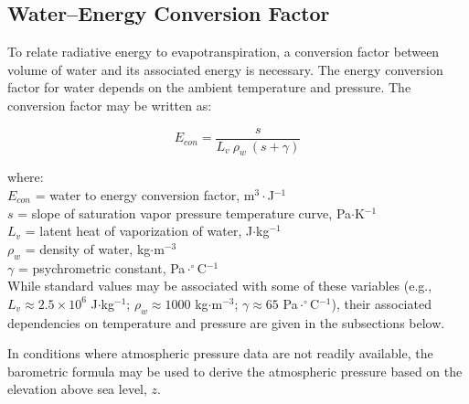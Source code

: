 \subsection{Water--Energy Conversion Factor}
\label{sec:econ}
To relate radiative energy to evapotranspiration, a conversion factor between volume of water and its associated energy is necessary. 
The energy conversion factor for water depends on the ambient temperature and pressure. The conversion factor may be written as:

\begin{equation}
\label{eq:econ}
	E_{con} = \frac{s}{L_v\: \rho_w\: \left( s + \gamma \right)}
\end{equation}

\noindent where: \\
\indent $E_{con}$ = water to energy conversion factor, m$^{3}\cdot$J$^{-1}$\\
\indent $s$ = slope of saturation vapor pressure temperature curve, Pa$\cdot$K$^{-1}$ \\
\indent $L_v$ = latent heat of vaporization of water, J$\cdot$kg$^{-1}$\\
\indent $\rho_w$ = density of water, kg$\cdot$m$^{-3}$\\
\indent $\gamma$ = psychrometric constant, Pa$\cdot^{\circ}$C$^{-1}$ \\

\noindent While standard values may be associated with some of these variables (e.g., $L_v \approx 2.5\times 10^6$ J$\cdot$kg$^{-1}$; $\rho_w \approx 1000$ kg$\cdot$m$^{-3}$; $\gamma \approx 65$ Pa$\cdot^{\circ}$C$^{-1}$), their associated dependencies on temperature and pressure are given in the subsections below.

In conditions where atmospheric pressure data are not readily available, the barometric formula may be used to derive the atmospheric pressure based on the elevation above sea level, $z$.

